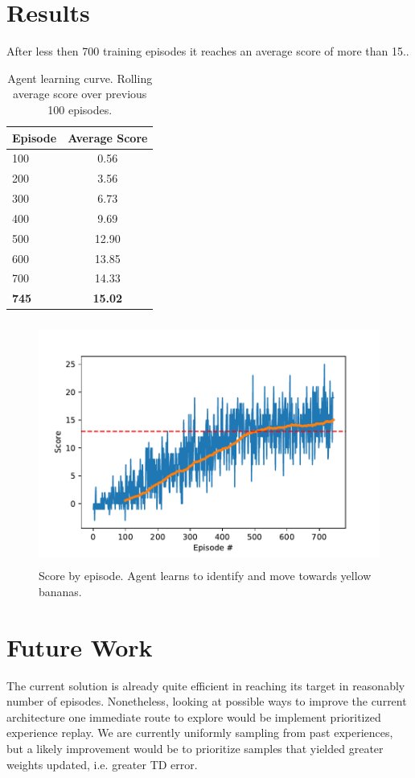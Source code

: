 \documentclass[pagenumber=off]{article}
\begin{document}
\section{Results}

After less then 700 training episodes it reaches an average score of more than 15..  

\begin{table}[h]
  \centering
    \begin{tabular}{|l|c|}
      \hline
      {\bf Episode} & {\bf Average Score} \\ 
      \hline
      100 & 0.56 \\
      200 & 3.56 \\
      300 & 6.73 \\
      400 & 9.69 \\
      500 & 12.90 \\
      600 & 13.85 \\
      700 & 14.33 \\
      \hline
      {\bf 745} & {\bf 15.02} \\      
      \hline
    \end{tabular}
    \caption{Agent learning curve. Rolling average score over previous 100 episodes.}
  \end{table}

\vspace{-1cm}
\begin{figure}[!h]
  \centerline{\includegraphics[page=1, height=8cm, width=14cm, angle=0]{./Average_Score.pdf}}
  \caption{Score by episode. Agent learns to identify and move towards yellow bananas.}
\end{figure}


\section{Future Work}

The current solution is already quite efficient in reaching its target in reasonably number of episodes.
Nonetheless, looking at possible ways to improve the current architecture one immediate route to explore would be implement prioritized experience replay. We are currently uniformly sampling from past experiences, but a likely improvement would be to prioritize samples that yielded greater weights updated, i.e. greater TD error.
\end{document}
